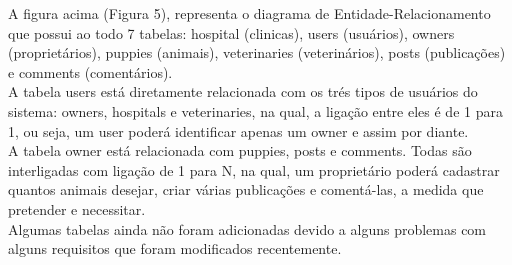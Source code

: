 A figura acima (Figura 5), representa o diagrama de Entidade-Relacionamento que possui ao todo 7 tabelas: hospital (clinicas), users (usuários), owners (proprietários), puppies (animais), veterinaries (veterinários), posts (publicações) e comments (comentários). 
\\
\indent
A tabela users está diretamente relacionada com os trés tipos de usuários do sistema: owners, hospitals e veterinaries, na qual, a ligação entre eles é de 1 para 1, ou seja, um user poderá identificar apenas um owner e assim por diante. 
\\
\indent
A tabela owner está relacionada com puppies, posts e comments. Todas são interligadas com ligação de 1 para N, na qual, um proprietário poderá cadastrar quantos animais desejar, criar várias publicações e comentá-las,  a medida que pretender e necessitar.
\\
\indent
Algumas tabelas ainda não foram adicionadas devido a alguns problemas com alguns requisitos que foram modificados recentemente.


